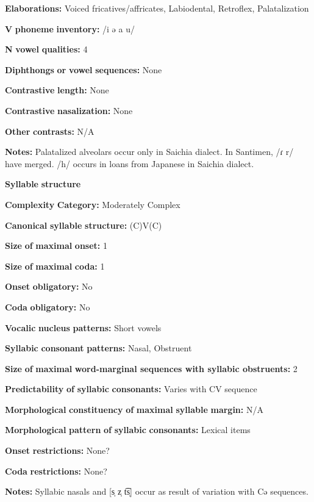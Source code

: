 \begin{styleBody}
\textbf{Elaborations:} Voiced fricatives/affricates, Labiodental, Retroflex, Palatalization

\textbf{V} \textbf{phoneme} \textbf{inventory:} /i ə a u/

\textbf{N} \textbf{vowel} \textbf{qualities:} 4

\textbf{Diphthongs} \textbf{or} \textbf{vowel} \textbf{sequences:} None

\textbf{Contrastive} \textbf{length:} None

\textbf{Contrastive} \textbf{nasalization:} None

\textbf{Other} \textbf{contrasts:} N/A

\textbf{Notes:} Palatalized alveolars occur only in Saichia dialect. In Santimen, /ɾ r/ have merged. /h/ occurs in loans from Japanese in Saichia dialect.

\textbf{Syllable} \textbf{structure}

\textbf{Complexity} \textbf{Category:} Moderately Complex

\textbf{Canonical} \textbf{syllable} \textbf{structure:} (C)V(C) \citep[31-34]{Chang2006}

\textbf{Size} \textbf{of} \textbf{maximal} \textbf{onset:} 1

\textbf{Size} \textbf{of} \textbf{maximal} \textbf{coda:} 1

\textbf{Onset} \textbf{obligatory:} No

\textbf{Coda} \textbf{obligatory:} No

\textbf{Vocalic} \textbf{nucleus} \textbf{patterns:} Short vowels

\textbf{Syllabic} \textbf{consonant} \textbf{patterns:} Nasal, Obstruent

\textbf{Size} \textbf{of} \textbf{maximal} \textbf{word{}-marginal sequences with syllabic obstruents:} 2

\textbf{Predictability} \textbf{of} \textbf{syllabic} \textbf{consonants:} Varies with CV sequence

\textbf{Morphological} \textbf{constituency} \textbf{of} \textbf{maximal} \textbf{syllable} \textbf{margin:} N/A

\textbf{Morphological} \textbf{pattern} \textbf{of} \textbf{syllabic} \textbf{consonants:} Lexical items

\textbf{Onset} \textbf{restrictions:} None?

\textbf{Coda} \textbf{restrictions:} None?

\textbf{Notes:} Syllabic nasals and [s̩ z̩ t͡s̩] occur as result of variation with Cə sequences.


\end{styleBody}
